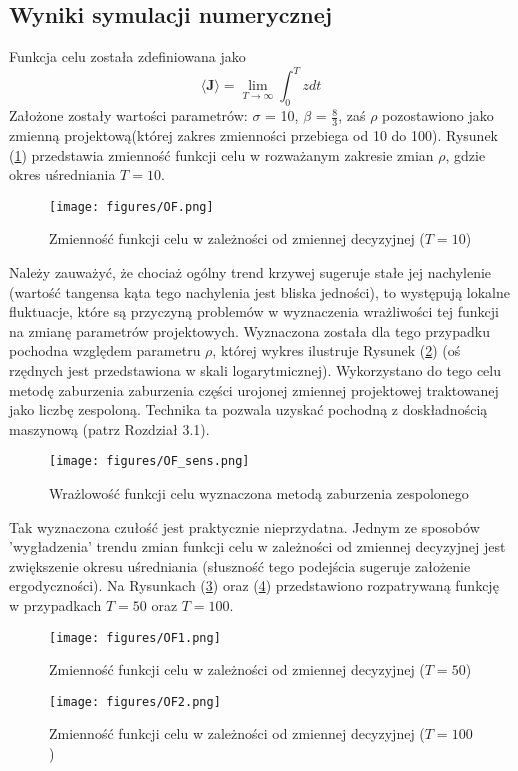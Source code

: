 \documentclass[12pt, twoside]{book}
\begin{document}
\subsection{Wyniki symulacji numerycznej}
Funkcja celu została zdefiniowana jako
\begin{equation}
\langle\textbf{J}\rangle = \lim\limits_{\textit{T}\to\infty}\int_{0}^{T}zdt
\label{lorenz_J}
\end{equation} 
Założone zostały wartości parametrów: $\sigma$ = 10, $\beta$ = $\frac{8}{3}$, zaś $\rho$ pozostawiono jako zmienną projektową(której zakres zmienności przebiega od 10 do 100). Rysunek (\ref{Fig16}) przedstawia zmienność funkcji celu w rozważanym zakresie zmian $ \rho $, gdzie okres uśredniania $ T = 10 $.
\begin{figure}[hp]
	\texttt{[image: figures/OF.png]} 
	\centering
	\caption{Zmienność funkcji celu w zależności od zmiennej decyzyjnej ($ T=10 $)}
	\label{Fig16}
\end{figure}
Należy zauważyć, że chociaż ogólny trend krzywej sugeruje stałe jej nachylenie (wartość tangensa kąta tego nachylenia jest bliska jedności), to występują lokalne fluktuacje, które są przyczyną problemów w wyznaczenia wrażliwości tej funkcji na zmianę parametrów projektowych. Wyznaczona została dla tego przypadku pochodna względem parametru $ \rho $, której wykres ilustruje Rysunek (\ref{Fig17}) (oś rzędnych jest przedstawiona w skali logarytmicznej). Wykorzystano do tego celu metodę zaburzenia zaburzenia części urojonej zmiennej projektowej traktowanej jako liczbę zespoloną. Technika ta pozwala uzyskać pochodną z doskładnością maszynową (patrz Rozdział 3.1).
\begin{figure}[hp]
	\texttt{[image: figures/OF\_sens.png]} 
	\centering
	\caption{Wrażlowość funkcji celu wyznaczona metodą zaburzenia zespolonego}
	\label{Fig17}
\end{figure}
Tak wyznaczona czułość jest praktycznie nieprzydatna. Jednym ze sposobów 'wygładzenia' trendu zmian funkcji celu w zależności od zmiennej decyzyjnej jest zwiększenie okresu uśredniania (słuszność tego podejścia sugeruje założenie ergodyczności). Na Rysunkach (\ref{Fig18}) oraz (\ref{Fig19}) przedstawiono rozpatrywaną funkcję w przypadkach $ T = 50 $ oraz $ T = 100 $.
\begin{figure}[hp]
	\texttt{[image: figures/OF1.png]} 
	\centering
	\caption{Zmienność funkcji celu w zależności od zmiennej decyzyjnej ($ T=50 $)}
	\label{Fig18}
\end{figure}
\begin{figure}[hp]
	\texttt{[image: figures/OF2.png]} 
	\centering
	\caption{Zmienność funkcji celu w zależności od zmiennej decyzyjnej ($ T=100 $)}
	\label{Fig19}
\end{figure}
\end{document}
